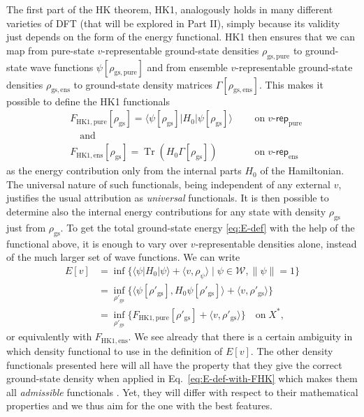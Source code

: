 \documentclass[journal=apcach,manuscript=article,layout=twocolumn]{achemso}
\newcommand{\psispace}{\mathcal{W}}
\newcommand{\rhogs}{{\rho_\mathrm{gs}}}
\newcommand{\rhogsprime}{{\rho'_\mathrm{gs}}}
\newcommand{\rhogspure}{{\rho_\mathrm{gs,pure}}}
\newcommand{\rhogsens}{{\rho_\mathrm{gs,ens}}}
\newcommand{\FHKpure}{F_\mathrm{HK1,pure}}
\newcommand{\FHKens}{F_\mathrm{HK1,ens}}
\newcommand{\vrep}{\ensuremath{v\text{-}\mathsf{rep}}}
\newcommand{\vreppure}{\ensuremath{\vrep_\mathrm{pure}}}
\newcommand{\vrepens}{\ensuremath{\vrep_\mathrm{ens}}}
\DeclareMathOperator{\trace}{Tr}
\newcommand{\changed}[1] {{ {#1}}} %
\begin{document}
The first part of the \changed{HK} theorem, HK1, analogously holds in many different varieties of DFT (that will be explored in Part II), simply because its validity just depends on the form of the energy functional. 
HK1 then ensures that we can map from pure-state $v$-representable ground-state densities $\rhogspure$ to ground-state wave functions $\psi[\rhogspure]$ and from ensemble $v$-representable ground-state densities $\rhogsens$ to ground-state density matrices $\Gamma[\rhogsens]$. This makes it possible to define the HK1 functionals
\begin{subequations}\label{eq:F-HK-def}
\begin{alignat}{3}
    \label{eq:F-HKpure-def}
    &\FHKpure[\rhogs] = \langle \psi[\rhogs] |H_0 |\psi[\rhogs] \rangle &&\,\,\,\, \text{on}\; \vreppure  \\
    \label{eq:F-HKens-def}
    &\quad \text{and} \nonumber \\
    &\FHKens[\rhogs] = \trace (H_0 \Gamma[\rhogs]  ) &&\,\,\,\,\text{on}\; \vrepens
\end{alignat}
\end{subequations}
as the energy contribution only from the internal parts $H_0$ of the Hamiltonian. 
\changed{The universal nature of such functionals, being independent of any external $v$, justifies the usual attribution as \textit{universal} functionals.
It is then} possible to determine also the internal energy contributions for any state with density $\rhogs$ just from $\rhogs$.
To get the total ground-state energy \eqref{eq:E-def} with the help of the functional above, it is enough to vary over $v$-representable densities alone, instead of the much larger set of wave functions. We can write
\begin{equation}\label{eq:E-def-with-FHK}
\begin{aligned}
E[v] &= \inf\{ \langle \psi |H_0|\psi \rangle + \langle v,\rho_\psi \rangle \mid \psi \in \psispace, \|\psi\|=1 \} \\
&= \inf_{\rhogsprime}\{ \langle \psi[\rhogsprime],H_0\psi[\rhogsprime] \rangle + \langle v,\rhogsprime \rangle \} \\
&= \inf_\rhogsprime\{ \FHKpure[\rhogsprime] + \langle v,\rhogsprime \rangle \} \quad\text{on}\; X^*,
\end{aligned}
\end{equation}
or equivalently with $\FHKens$. 
We see already that there is a certain ambiguity in which density functional to use in the definition of $E[v]$. The other density functionals presented here will all have the property that they give the correct ground-state density when applied in Eq.~\eqref{eq:E-def-with-FHK} which makes them all \emph{admissible} functionals \cite{kvaal-helgaker2015admissible}. Yet, they will differ with respect to their mathematical properties and we thus aim for the one with the best features.
\end{document}
